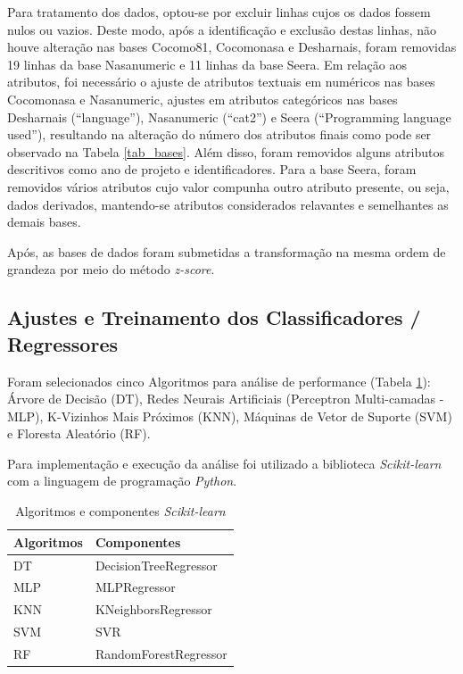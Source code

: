 \documentclass[12pt]{article}
\begin{document}
Para tratamento dos dados, optou-se por excluir linhas cujos os dados fossem nulos ou vazios. Deste modo, após a identificação e exclusão destas linhas, não houve alteração nas bases Cocomo81, Cocomonasa e Desharnais, foram removidas 19 linhas da base Nasanumeric e 11 linhas da base Seera. Em relação aos atributos, foi necessário o ajuste de atributos textuais em numéricos nas bases Cocomonasa e Nasanumeric, ajustes em atributos categóricos nas bases Desharnais (``language''), Nasanumeric (``cat2'') e Seera (``Programming language used''), resultando na alteração do número dos atributos finais como pode ser observado na Tabela \ref{tab_bases}. Além disso, foram removidos alguns atributos descritivos como ano de projeto e identificadores. Para a base Seera, foram removidos vários atributos cujo valor compunha outro atributo presente, ou seja, dados derivados, mantendo-se atributos considerados relavantes e semelhantes as demais bases.

Após, as bases de dados foram submetidas a transformação na mesma ordem de grandeza por meio do método \textit{z-score}.

\subsection{Ajustes e Treinamento dos Classificadores / Regressores}
\label{treinamento}

Foram selecionados cinco Algoritmos para análise de performance (Tabela \ref{tab_algoritmos}): Árvore de Decisão (DT), Redes Neurais Artificiais (Perceptron Multi-camadas - MLP), K-Vizinhos Mais Próximos (KNN), Máquinas de Vetor de Suporte (SVM) e Floresta Aleatório (RF).

Para implementação e execução da análise foi utilizado a biblioteca \textit{Scikit-learn} \cite{scikitlearn:2011} com a linguagem de programação \textit{Python}.

\begin{table}[h!]
  \begin{center}
    \caption{Algoritmos e componentes \textit{Scikit-learn}}
    \label{tab_algoritmos}
    \begin{tabular}{l|l}
      \textbf{Algoritmos} & \textbf{Componentes}  \\
      \hline
      DT                  & DecisionTreeRegressor \\
      MLP                 & MLPRegressor          \\
      KNN                 & KNeighborsRegressor   \\
      SVM                 & SVR                   \\
      RF                  & RandomForestRegressor \\
    \end{tabular}
  \end{center}
\end{table}
\end{document}
